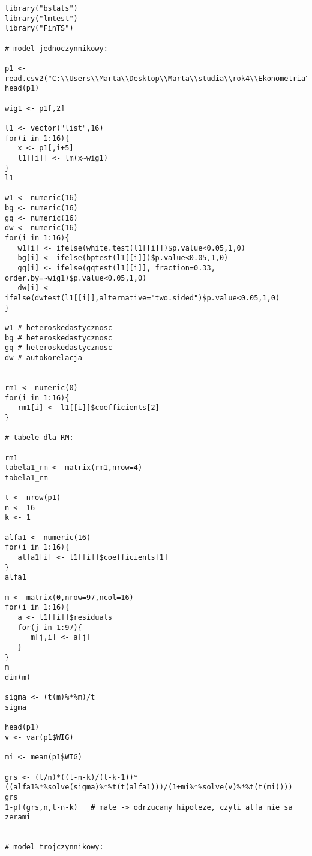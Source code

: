 \documentclass[11pt,a4paper]{report}
\begin{document}
\begin{small}
\begin{lstlisting}
library("bstats")
library("lmtest")
library("FinTS")

# model jednoczynnikowy:

p1 <- read.csv2("C:\\Users\\Marta\\Desktop\\Marta\\studia\\rok4\\Ekonometria\\spr3\\portfele_z1.csv",sep=";",header=TRUE)
head(p1)

wig1 <- p1[,2]

l1 <- vector("list",16)
for(i in 1:16){
   x <- p1[,i+5]
   l1[[i]] <- lm(x~wig1)
}
l1

w1 <- numeric(16)
bg <- numeric(16)
gq <- numeric(16)
dw <- numeric(16)
for(i in 1:16){
   w1[i] <- ifelse(white.test(l1[[i]])$p.value<0.05,1,0)
   bg[i] <- ifelse(bptest(l1[[i]])$p.value<0.05,1,0)
   gq[i] <- ifelse(gqtest(l1[[i]], fraction=0.33, order.by=~wig1)$p.value<0.05,1,0)
   dw[i] <- ifelse(dwtest(l1[[i]],alternative="two.sided")$p.value<0.05,1,0)
}

w1 # heteroskedastycznosc
bg # heteroskedastycznosc
gq # heteroskedastycznosc
dw # autokorelacja


rm1 <- numeric(0)
for(i in 1:16){
   rm1[i] <- l1[[i]]$coefficients[2]
}

# tabele dla RM:

rm1
tabela1_rm <- matrix(rm1,nrow=4)
tabela1_rm

t <- nrow(p1)
n <- 16
k <- 1

alfa1 <- numeric(16)
for(i in 1:16){
   alfa1[i] <- l1[[i]]$coefficients[1]
}
alfa1

m <- matrix(0,nrow=97,ncol=16)
for(i in 1:16){
   a <- l1[[i]]$residuals
   for(j in 1:97){
      m[j,i] <- a[j]
   }
}
m
dim(m)

sigma <- (t(m)%*%m)/t
sigma

head(p1)
v <- var(p1$WIG)

mi <- mean(p1$WIG)

grs <- (t/n)*((t-n-k)/(t-k-1))*((alfa1%*%solve(sigma)%*%t(t(alfa1)))/(1+mi%*%solve(v)%*%t(t(mi))))
grs
1-pf(grs,n,t-n-k)   # male -> odrzucamy hipoteze, czyli alfa nie sa zerami


# model trojczynnikowy:


\end{lstlisting}
\end{small}
\end{document}
